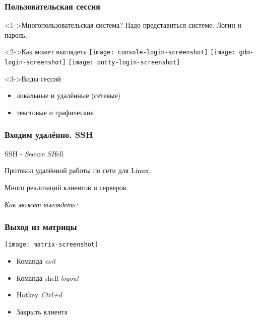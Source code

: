 \begin{frame}
  \frametitle{Пользовательская сессия}

  \begin{center}
    \begin{block}<1->{Многопользовательская система?}
      Надо представиться системе. Логин и пароль.
    \end{block}

    \begin{block}<2->{Как может выглядеть}
      \texttt{[image: console-login-screenshot]}
      \texttt{[image: gdm-login-screenshot]}
      \texttt{[image: putty-login-screenshot]}
    \end{block}

    \begin{block}<3->{Виды сессий}
      \begin{itemize}
        \item локальные и удалённые (сетевые)
        \item текстовые и графические
      \end{itemize}
    \end{block}

  \end{center}

\end{frame}

\begin{frame}
  \frametitle{Входим удалённо. SSH}

  \begin{center}

    SSH - \emph{S}ecure \emph{SH}ell
    \newline \pause

    Протокол удалённой работы по сети для Linux.

    Много реализаций клиентов и серверов.
    \newline
    \pause

    \emph{Как может выглядеть:}
    \newline
    \emph{ }
  \end{center}

\end{frame}

\begin{frame}
  \frametitle{Выход из матрицы}

  \begin{center}
    \texttt{[image: matrix-screenshot]}
    \pause
    \newline
    \begin{itemize}
      \item Команда \emph{exit}
      \item Команда shell \emph{logout}
      \item Hotkey \emph{Ctrl+d}
      \item Закрыть клиента
    \end{itemize}
  \end{center}

\end{frame}
